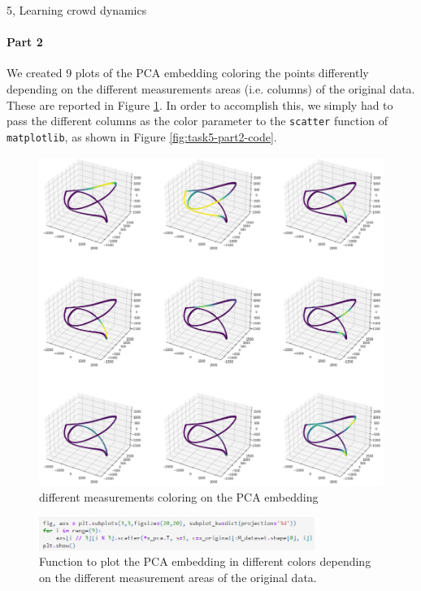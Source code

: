 \documentclass[10pt,a4paper]{article}
\begin{document}
\begin{task}{5, Learning crowd dynamics}
\paragraph{Part 2}
We created 9 plots of the PCA embedding coloring the points differently depending on the different measurements areas (i.e. columns) of the original data. These are reported in Figure \ref{fig:task5-part2}.
In order to accomplish this, we simply had to pass the different columns as the color parameter to the \texttt{scatter} function of \texttt{matplotlib}, as shown in Figure \ref{fig:task5-part2-code}.

\begin{figure}[H]
    \centering
    \includegraphics[scale=0.7]{images/task5-part2.png}
    \caption{different measurements coloring on the PCA embedding}
    \label{fig:task5-part2}
\end{figure}

\begin{figure}[H]
    \centering
    \includegraphics[width=0.8\textwidth]{images/task5-part2-code.png}
    \caption{Function to plot the PCA embedding in different colors depending on the different measurement areas of the original data.}
    \label{fig:my_label}
\end{figure}


\end{task}
\end{document}
